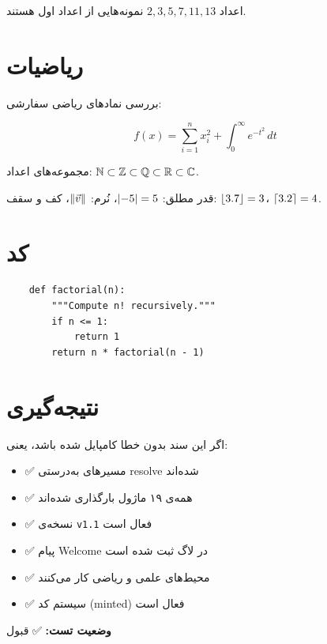 \documentclass{matinbook}
\begin{document}
\begin{example}
    اعداد $2, 3, 5, 7, 11, 13$ نمونه‌هایی از اعداد اول هستند.
\end{example}

\section{ریاضیات}
\label{sec:math}

بررسی نمادهای ریاضی سفارشی:

\begin{equation}
    \label{eq:test}
    f(x) = \sum_{i=1}^{n} x_i^2 + \int_{0}^{\infty} e^{-t^2} \, dt
\end{equation}

مجموعه‌های اعداد: $\mathbb{N} \subset \mathbb{Z} \subset \mathbb{Q} \subset \mathbb{R} \subset \mathbb{C}$.

قدر مطلق: $\lvert-5\rvert = 5$، نُرم: $\lVert\vec{v}\rVert$،
کف و سقف: $\lfloor3.7\rfloor = 3$، $\lceil3.2\rceil = 4$.

\section{کد}
\label{sec:code}

\begin{latin}
    \begin{verbatim}
    def factorial(n):
        """Compute n! recursively."""
        if n <= 1:
            return 1
        return n * factorial(n - 1)
    \end{verbatim}
\end{latin}

\section{نتیجه‌گیری}
\label{sec:conclusion}

اگر این سند بدون خطا کامپایل شده باشد، یعنی:

\begin{itemize}
    \item ✅ مسیرهای \verb|| به‌درستی resolve شده‌اند
    \item ✅ همه‌ی ۱۹ ماژول بارگذاری شده‌اند
    \item ✅ نسخه‌ی \verb|v1.1| فعال است
    \item ✅ پیام Welcome در لاگ ثبت شده است
    \item ✅ محیط‌های علمی و ریاضی کار می‌کنند
    \item ✅ سیستم کد (minted) فعال است
\end{itemize}

\textbf{وضعیت تست:} ✅ قبول
\end{document}
